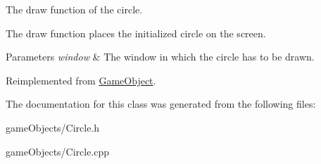 The draw function of the circle. 

The draw function places the initialized circle on the screen. 
\begin{DoxyParams}{Parameters}
{\em window} & The window in which the circle has to be drawn. \\
\hline
\end{DoxyParams}


Reimplemented from \hyperlink{class_game_object_ae6e4f8704ff32dbd42990ba63954c340}{Game\+Object}.



The documentation for this class was generated from the following files\+:\begin{DoxyCompactItemize}
\item 
game\+Objects/Circle.\+h\item 
game\+Objects/Circle.\+cpp\end{DoxyCompactItemize}
